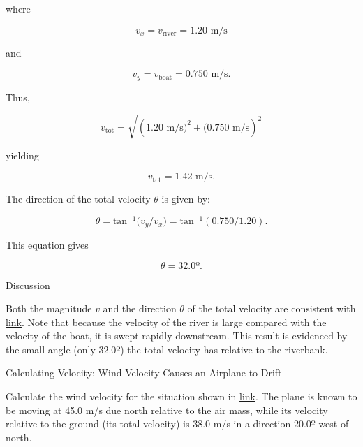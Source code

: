 \documentclass[
]{book}
\begin{document}
where

\leavevmode{}%
\[{{{v_{x} = v_{\text{river}}} = 1}\text{.}\text{20\ m/s}}{}\]

and

\leavevmode{}%
\[{{{v_{y} = v_{\text{boat}}} = 0}\text{.}\text{750\ m/s.}}{}\]

Thus,

\leavevmode{}%
\[{v_{\text{tot}} = \sqrt{(1\text{.}\text{20\ m/s}{)^{2} + (}0\text{.}\text{750\ m/s})^{2}}}{}\]

yielding

\leavevmode{}%
\[{{v_{\text{tot}} = 1}\text{.}\text{42\ m/s.}}{}\]

The direction of the total velocity \(\theta{}\) is given by:

\leavevmode{}%
\[{{\theta = \text{tan}^{- 1}}({v_{y}/v_{x}}{) = \text{tan}^{- 1}}(0\text{.}{\text{750}/1}\text{.}\text{20})}\text{.}{}\]

This equation gives

\leavevmode{}%
\[{{{\theta = \text{32}}\text{.}0º}\text{.}}{}\]

{Discussion}

Both the magnitude \(v\) and the direction \(\theta\) of the total velocity
are consistent with
\protect\hyperlink{import-auto-id2070798}{link}. Note that
because the velocity of the river is large compared with the velocity of
the boat, it is swept rapidly downstream. This result is evidenced by
the small angle (only \(32.0º\)) the total velocity has relative to the
riverbank.

\hypertarget{fs-id1088238}{}
Calculating Velocity: Wind Velocity Causes an Airplane to Drift

Calculate the wind velocity for the situation shown in
\protect\hyperlink{import-auto-id1546060}{link}. The plane is
known to be moving at 45.0 m/s due north relative to the air mass, while
its velocity relative to the ground (its total velocity) is 38.0 m/s in
a direction \({\text{20}\text{.0º}}{}\) west of north.
\end{document}
